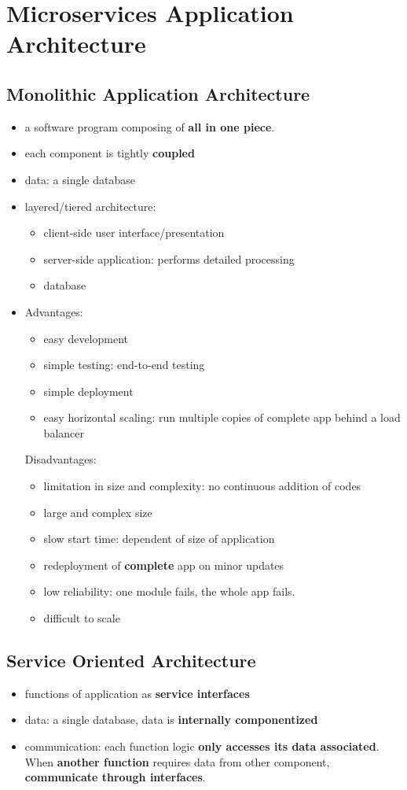 \section{Microservices Application Architecture}

\subsection{Monolithic Application Architecture}
\begin{itemize}
	\item a software program composing of \textbf{all in one piece}.
	\item each component is tightly \textbf{coupled}
	\item data: a single database
	\item layered/tiered architecture: 
	\begin{itemize}
		\item client-side user interface/presentation
		\item server-side application: performs detailed processing
		\item database
	\end{itemize}
	\item Advantages:
	\begin{itemize}
		\item easy development
		\item simple testing: end-to-end testing
		\item simple deployment
		\item easy horizontal scaling: run multiple copies of complete app behind a load balancer
	\end{itemize}
	Disadvantages:
	\begin{itemize}
		\item limitation in size and complexity: no continuous addition of codes
		\item large and complex size
		\item slow start time: dependent of size of application
		\item redeployment of \textbf{complete} app on minor updates
		\item low reliability: one module fails, the whole app fails.
		\item difficult to scale
	\end{itemize}
\end{itemize}

\subsection{Service Oriented Architecture}
\begin{itemize}
	\item functions of application as \textbf{service interfaces}
	\item data: a single database, data is \textbf{internally componentized}
	\item communication: each function logic \textbf{only accesses its data associated}. When \textbf{another function} requires data from other component, \textbf{communicate through interfaces}. 
\end{itemize}

